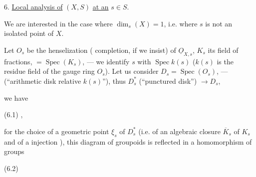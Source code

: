 6. \uline{Local analysis of} $(X,S)$ \uline{at an} $s\in S$.

We are interested in the case where $\dim_s(X)=1$, i.e. where $s$ is not an
isolated point of $X$.

Let $O_s$ be the henselization ( completion, if we insist)
of $\underline{O}_{X,s}$, $K_s$ its field of fractions,
$=\operatorname{Spec}(K_s)$, --- we identify $s$ with
$\operatorname{Spec} k(s)$ ($k(s)$ is the residue field of
the gauge ring $O_s$). Let us consider
$D_s=\operatorname{Spec}(O_s)$, ---
(``arithmetic disk relative  $k(s)$''), thus
$D_s^*$ 
(``punctured disk'') $\longrightarrow D_s$,



we have

(6.1)
,

for the choice of a geometric point $\xi_s$ of $D_s^*$
 (i.e. of an algebraic closure
$\overline K_s$ of $K_s$ and of a injection
),
this diagram of groupoids is reflected in a homomorphism of groups

(6.2)


